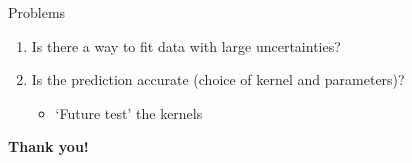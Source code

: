 \documentclass[aspectratio=169,11pt]{beamer}
\begin{document}
\begin{frame}[t]{Problems}
  \begin{enumerate}
    \item Is there a way to fit data with large uncertainties?
    \item Is the prediction accurate (choice of kernel and parameters)?
    \begin{itemize}
      \item `Future test' the kernels
    \end{itemize}
  \end{enumerate}
\end{frame}



\bgroup
  \begin{frame}{}
    \color{white}
    \huge
    \begin{center}
      \textbf{Thank you!}
    \end{center}
  \end{frame}
\egroup


% 
\end{document}
